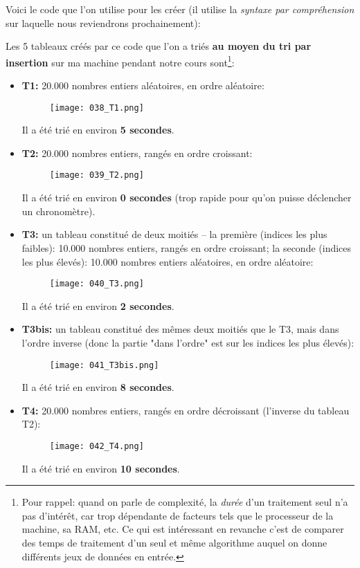 \documentclass[12pt]{article}
\begin{document}
	Voici le code que l'on utilise pour les créer (il utilise la \textit{syntaxe par compréhension} sur laquelle nous reviendrons prochainement):
	
	Les 5 tableaux créés par ce code que l'on a triés \textbf{au moyen du tri par insertion} sur ma machine pendant notre cours sont\footnote{Pour rappel: quand on parle de complexité, la \textit{durée} d'un traitement seul n'a pas d'intérêt, car trop dépendante de facteurs tels que le processeur de la machine, sa RAM, etc. Ce qui est intéressant en revanche c'est de comparer des temps de traitement d'un seul et même algorithme auquel on donne différents jeux de données en entrée.}:
	\begin{itemize}
		\item \textbf{T1:} 20.000 nombres entiers aléatoires, en ordre aléatoire:
		\begin{figure}[H]
			\centering
			\texttt{[image: 038\_T1.png]}
		\end{figure}
		\qquad \Large \faSortAlphaAsc \normalsize \quad Il a été trié en environ \textbf{5 secondes}.
		\item \textbf{T2:} 20.000 nombres entiers, rangés en ordre croissant:
		\begin{figure}[H]
			\centering
			\texttt{[image: 039\_T2.png]}
		\end{figure}
		\qquad \Large \faSortAlphaAsc \normalsize \quad Il a été trié en environ \textbf{0 secondes} (trop rapide pour qu'on puisse déclencher un chronomètre).
		\item \textbf{T3:} un tableau constitué de deux moitiés -- la première (indices les plus faibles): 10.000 nombres entiers, rangés en ordre croissant; la seconde (indices les plus élevés): 10.000 nombres entiers aléatoires, en ordre aléatoire:
		\begin{figure}[H]
			\centering
			\texttt{[image: 040\_T3.png]}
		\end{figure}
		\qquad \Large \faSortAlphaAsc \normalsize \quad Il a été trié en environ \textbf{2 secondes}.
		\item \textbf{T3bis:} un tableau constitué des mêmes deux moitiés que le T3, mais dans l'ordre inverse (donc la partie "dans l'ordre" est sur les indices les plus élevés):
		\begin{figure}[H]
			\centering
			\texttt{[image: 041\_T3bis.png]}
		\end{figure}
		\qquad \Large \faSortAlphaAsc \normalsize \quad Il a été trié en environ \textbf{8 secondes}.
		\item \textbf{T4:} 20.000 nombres entiers, rangés en ordre décroissant (l'inverse du tableau T2):
		\begin{figure}[H]
			\centering
			\texttt{[image: 042\_T4.png]}
		\end{figure}
		\qquad \Large \faSortAlphaAsc \normalsize \quad Il a été trié en environ \textbf{10 secondes}.
	\end{itemize}
	
\end{document}
